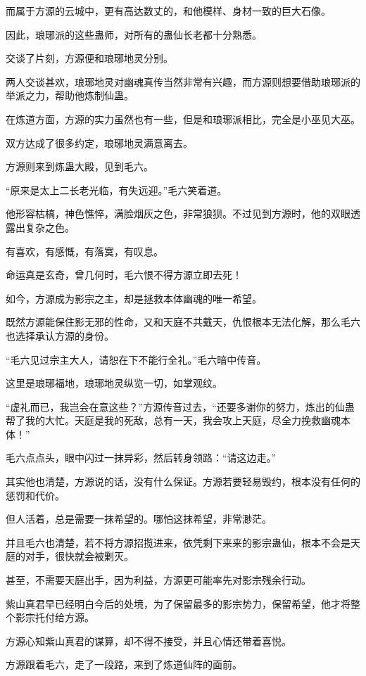 \begin{this_body}
而属于方源的云城中，更有高达数丈的，和他模样、身材一致的巨大石像。

因此，琅琊派的这些蛊师，对所有的蛊仙长老都十分熟悉。

交谈了片刻，方源便和琅琊地灵分别。

两人交谈甚欢，琅琊地灵对幽魂真传当然非常有兴趣，而方源则想要借助琅琊派的举派之力，帮助他炼制仙蛊。

在炼道方面，方源的实力虽然也有一些，但是和琅琊派相比，完全是小巫见大巫。

双方达成了很多约定，琅琊地灵满意离去。

方源则来到炼蛊大殿，见到毛六。

“原来是太上二长老光临，有失远迎。”毛六笑着道。

他形容枯槁，神色憔悴，满脸烟灰之色，非常狼狈。不过见到方源时，他的双眼透露出复杂之色。

有喜欢，有感慨，有落寞，有叹息。

命运真是玄奇，曾几何时，毛六恨不得方源立即去死！

如今，方源成为影宗之主，却是拯救本体幽魂的唯一希望。

既然方源能保住影无邪的性命，又和天庭不共戴天，仇恨根本无法化解，那么毛六也选择承认方源的身份。

“毛六见过宗主大人，请恕在下不能行全礼。”毛六暗中传音。

这里是琅琊福地，琅琊地灵纵览一切，如掌观纹。

“虚礼而已，我岂会在意这些？”方源传音过去，“还要多谢你的努力，炼出的仙蛊帮了我的大忙。天庭是我的死敌，总有一天，我会攻上天庭，尽全力挽救幽魂本体！”

毛六点点头，眼中闪过一抹异彩，然后转身领路：“请这边走。”

其实他也清楚，方源说的话，没有什么保证。方源若要轻易毁约，根本没有任何的惩罚和代价。

但人活着，总是需要一抹希望的。哪怕这抹希望，非常渺茫。

并且毛六也清楚，若不将方源招揽进来，依凭剩下来来的影宗蛊仙，根本不会是天庭的对手，很快就会被剿灭。

甚至，不需要天庭出手，因为利益，方源更可能率先对影宗残余行动。

紫山真君早已经明白今后的处境，为了保留最多的影宗势力，保留希望，他才将整个影宗托付给方源。

方源心知紫山真君的谋算，却不得不接受，并且心情还带着喜悦。

方源跟着毛六，走了一段路，来到了炼道仙阵的面前。


\end{this_body}

